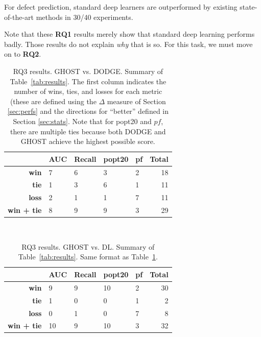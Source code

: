 \documentclass[10pt,compsoc,twocolumn]{IEEEtran}
\newcommand{\BLUE}{\color{blue}}
\newcommand{\BLACK}{\color{black}}
\begin{document}
\begin{blockquote}
    \noindent
    \BLUE
    For defect prediction, standard deep learners  are outperformed by existing state-of-the-art methods in 30/40 experiments. \BLACK
\end{blockquote}

 Note that these {\bf RQ1} results merely show that standard deep learning performs badly.
 Those results do not explain {\em why} that is so. For this task,
 we must move on to {\bf RQ2}.



\begin{table}[!t]
    \centering
    \caption{RQ3 results. GHOST vs. DODGE. 
    Summary of Table~\ref{tab:results}.
    The first column indicates the number of wins, ties,  and losses  for each metric (these are defined using the $\Delta$ measure of Section \ref{sec:perfs} and the directions for ``better'' defined in Section \ref{sec:stats}.  Note that for popt20 and $pf$, there are multiple ties because both DODGE and GHOST achieve the highest possible score.}
  
  \scriptsize
   \begin{tabular}{rllll|r} 
   \toprule
    & AUC & Recall & popt20 & pf & Total \\
    \midrule
     \textbf{win} & 7 & 6 & 3 & 2 & 18 \\
    \textbf{tie} & 1 & 3 & 6 & 1 & 11 \\
     \textbf{loss} & 2 & 1 & 1 & 7 & 11 \\ \midrule 
     \textbf{win + tie} & 8 & 9 & 9 & 3 & 29 \\
     \bottomrule
    \end{tabular}
    \ 
    \label{tab:ghost_dodge}
\end{table}
\begin{table}[!t]
    \centering
    \caption{RQ3 results. GHOST vs. DL. Summary of Table~\ref{tab:results}. Same format as Table~\ref{tab:ghost_dodge}.}
    \scriptsize
   \begin{tabular}{rllll|r} 
   \toprule
    & AUC & Recall & popt20 & pf & Total \\
    \midrule
     \textbf{win} & 9 & 9 & 10 & 2 & 30 \\
     \textbf{tie} & 1 & 0 & 0 & 1 & 2 \\
     \textbf{loss} & 0 & 1 & 0 & 7 & 8 \\ \midrule 
     \textbf{win + tie} & 10 & 9 & 10 & 3 & 32 \\
     \bottomrule 
    \end{tabular}
    \ 
    \label{tab:ghost_dl}
\end{table}
\end{document}
